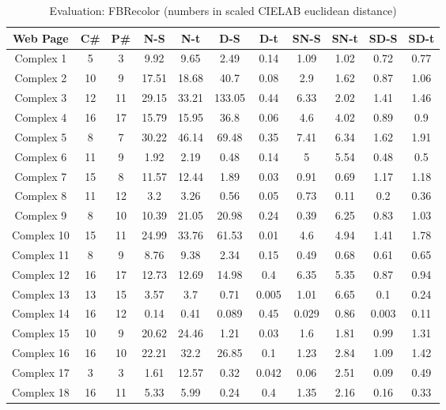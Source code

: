 \begin{table}[!htb]
\caption{Evaluation: FBRecolor (numbers in scaled CIELAB euclidean distance)}
\centering
\begin{tabular}{c c c c c c c c c c c}
\hline\hline
Web Page & C\# & P\# & N-S & N-t & D-S & D-t & SN-S & SN-t & SD-S & SD-t\\ [0.5ex]
\hline
Complex 1&5&3&9.92&9.65&2.49&0.14&1.09&1.02&0.72&0.77\\
Complex 2&10&9&17.51&18.68&40.7&0.08&2.9&1.62&0.87&1.06\\
Complex 3&12&11&29.15&33.21&133.05&0.44&6.33&2.02&1.41&1.46\\
Complex 4&16&17&15.79&15.95&36.8&0.06&4.6&4.02&0.89&0.9\\
Complex 5&8&7&30.22&46.14&69.48&0.35&7.41&6.34&1.62&1.91\\
Complex 6&11&9&1.92&2.19&0.48&0.14&5&5.54&0.48&0.5\\
Complex 7&15&8&11.57&12.44&1.89&0.03&0.91&0.69&1.17&1.18\\
Complex 8&11&12&3.2&3.26&0.56&0.05&0.73&0.11&0.2&0.36\\
Complex 9&8&10&10.39&21.05&20.98&0.24&0.39&6.25&0.83&1.03\\
Complex 10&15&11&24.99&33.76&61.53&0.01&4.6&4.94&1.41&1.78\\
Complex 11&8&9&8.76&9.38&2.34&0.15&0.49&0.68&0.61&0.65\\
Complex 12&16&17&12.73&12.69&14.98&0.4&6.35&5.35&0.87&0.94\\
Complex 13&13&15&3.57&3.7&0.71&0.005&1.01&6.65&0.1&0.24\\
Complex 14&16&12&0.14&0.41&0.089&0.45&0.029&0.86&0.003&0.11\\
Complex 15&10&9&20.62&24.46&1.21&0.03&1.6&1.81&0.99&1.31\\
Complex 16&16&10&22.21&32.2&26.85&0.1&1.23&2.84&1.09&1.42\\
Complex 17&3&3&1.61&12.57&0.32&0.042&0.06&2.51&0.09&0.49\\
Complex 18&16&11&5.33&5.99&0.24&0.4&1.35&2.16&0.16&0.33\\[1ex]
\hline
\end{tabular}
\label{table:nonlin}
\end{table}

